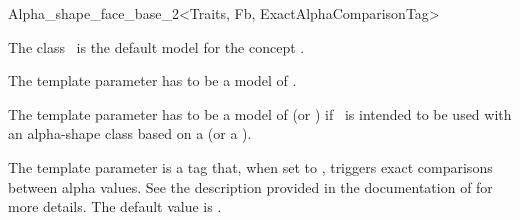 \begin{ccRefClass}{Alpha_shape_face_base_2<Traits, 
	                                         Fb,
                                           ExactAlphaComparisonTag>}

\ccDefinition

The class \ccRefName\ is the default  model for the concept .


\ccParameters
The template parameter  has to be a model of .

The template parameter  has to be a model of  (or )
if \ccClassTemplateName\ is intended to be used with an alpha-shape class based on a 
 (or a ).

The template parameter  is a tag that, when set to
, triggers exact comparisons between alpha values. See the description
provided in the documentation of  for more details. The default value is .


\ccIsModel
{}

\ccInheritsFrom



\end{ccRefClass}

